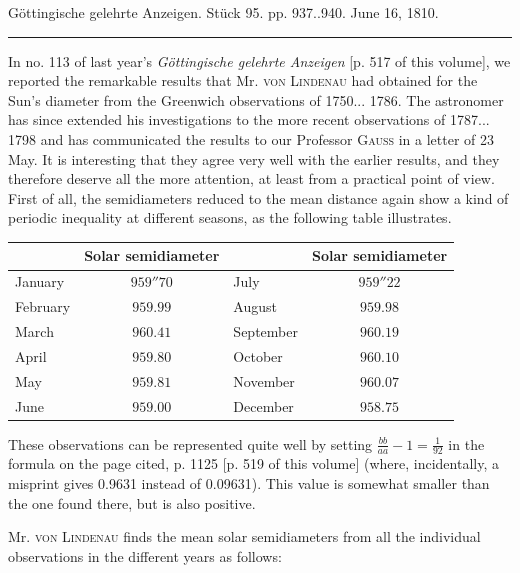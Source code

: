 \clearpage
{}
\hypertarget{native-530-lower}{}\label{native-530-lower}
\begin{center}\small Göttingische gelehrte Anzeigen. Stück 95. pp. 937..940. June 16, 1810.\\[3pt]\rule{.72\linewidth}{.3pt}\end{center}

In no. 113 of last year's \emph{Göttingische gelehrte Anzeigen} [p. 517 of this volume], we reported the remarkable results that Mr. \textsc{von Lindenau} had obtained for the Sun's diameter from the Greenwich observations of 1750... 1786. The astronomer has since extended his investigations to the more recent observations of 1787... 1798 and has communicated the results to our Professor \textsc{Gauss} in a letter of 23 May. It is interesting that they agree very well with the earlier results, and they therefore deserve all the more attention, at least from a practical point of view. First of all, the semidiameters reduced to the mean distance again show a kind of periodic inequality at different seasons, as the following table illustrates.

\begin{center} \begin{tabular}{l|c||l|c} & Solar semidiameter & & Solar semidiameter \\ \hline January & $959''70$ & July & $959''22$ \\ February & $959.99$ & August & $959.98$ \\ March & $960.41$ & September & $960.19$ \\ April & $959.80$ & October & $960.10$ \\ May & $959.81$ & November & $960.07$ \\ June & $959.00$ & December & $958.75$ \\ \end{tabular} \end{center}

These observations can be represented quite well by setting $\frac{bb}{aa} - 1 = \frac{1}{92}$ in the formula on the page cited, p. 1125 [p. 519 of this volume] (where, incidentally, a misprint gives 0.9631 instead of 0.09631). This value is somewhat smaller than the one found there, but is also positive.

Mr. \textsc{von Lindenau} finds the mean solar semidiameters from all the individual observations in the different years as follows:

